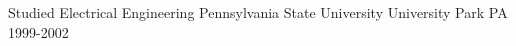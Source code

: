 


\begin{cventries}


\cventry
{Studied Electrical Engineering} %
{Pennsylvania State University}
{University Park PA} %
{1999-2002} %
{ %
\begin{cvitems}
\end{cvitems}
}


\end{cventries}
